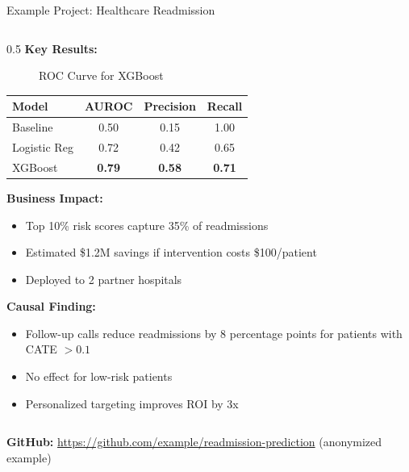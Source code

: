 \begin{frame}{Example Project: Healthcare Readmission}
\begin{columns}
\begin{column}{0.5\textwidth}
\textbf{Key Results:}

\begin{figure}
\centering
{}
\caption{ROC Curve for XGBoost}
\end{figure}

\begin{table}
\tiny
\centering
\begin{tabular}{|l|c|c|c|}
\hline
\rowcolor{navyblue!20}
\textbf{Model} & \textbf{AUROC} & \textbf{Precision} & \textbf{Recall} \\
\hline
Baseline & 0.50 & 0.15 & 1.00 \\
\hline
Logistic Reg & 0.72 & 0.42 & 0.65 \\
\hline
XGBoost & \textbf{0.79} & \textbf{0.58} & \textbf{0.71} \\
\hline
\end{tabular}
\end{table}

\vspace{0.2cm}

\textbf{Business Impact:}
\begin{itemize}
\item Top 10\% risk scores capture 35\% of readmissions
\item Estimated \$1.2M savings if intervention costs \$100/patient
\item Deployed to 2 partner hospitals
\end{itemize}

\vspace{0.2cm}

\textbf{Causal Finding:}
\begin{itemize}
\item Follow-up calls reduce readmissions by 8 percentage points for patients with CATE $> 0.1$
\item No effect for low-risk patients
\item Personalized targeting improves ROI by 3x
\end{itemize}
\end{column}
\end{columns}

\vspace{0.2cm}
\textbf{GitHub:} \url{https://github.com/example/readmission-prediction} (anonymized example)
\end{frame}

